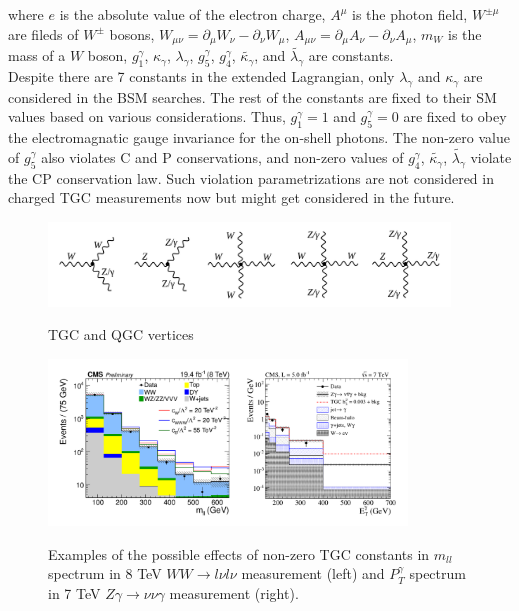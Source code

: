 where $e$ is the absolute value of the electron charge, $A^\mu$ is the photon field, $W^{\pm\mu}$ are fileds of $W^\pm$ bosons, $W_{\mu\nu}=\partial_\mu W_\nu - \partial_\nu W_\mu$, $A_{\mu\nu}=\partial_\mu A_\nu - \partial_\nu A_\mu$, $m_W$ is the mass of a $W$ boson, $g_1^\gamma$, $\kappa_\gamma$, $\lambda_\gamma$, $g_5^\gamma$, $g_4^\gamma$, $\tilde{\kappa_\gamma}$, and $\tilde{\lambda_\gamma}$ are constants.\\

Despite there are 7 constants in the extended Lagrangian, only $\lambda_\gamma$ and $\kappa_\gamma$ are considered in the BSM searches. The rest of the constants are fixed to their SM values based on various considerations. Thus, $g_1^\gamma=1$ and $g_5^\gamma=0$ are fixed to obey the electromagnatic gauge invariance for the on-shell photons. The non-zero value of $g_5^\gamma$ also violates C and P conservations, and non-zero values of $g_4^\gamma$, $\tilde{\kappa_\gamma}$, $\tilde{\lambda_\gamma}$ violate the CP conservation law. Such violation parametrizations are not considered in charged TGC measurements now but might get considered in the future.\\  

\begin{figure}[htb]
  \begin{center}
    {\includegraphics[width=0.95\textwidth]{../figs/WgAbout/TGC_and_QGC_vertices.png}}
    \caption{TGC and QGC vertices}
    \label{fig:TGC_and_QGC_vertices}
  \end{center}
\end{figure}

\begin{figure}[htb]
  \begin{center}
    {\includegraphics[width=0.85\textwidth]{../figs/WgAbout/aTGC_Pt_Examples.png}}
    \caption{Examples of the possible effects of non-zero TGC constants in $m_{ll}$ spectrum in 8 TeV $WW \rightarrow l\nu l\nu$ measurement (left) and $P_T^{\gamma}$ spectrum in 7 TeV $Z\gamma \rightarrow \nu\nu\gamma$ measurement (right).}
    \label{fig:aTGC_Pt_Examples}
  \end{center}
\end{figure}


